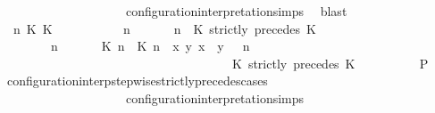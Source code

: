 \begin{isabellebody}
\ \ \ \ \ \ \ \ \ \ \ \ \ \ \ \ \ \ \ \ configuration{\isacharunderscore}interpretation{\isachardot}simps\ \isamarkupfalse%
\ blast\isanewline
\ \ \ \ \isamarkupfalse%
\isanewline
\ \ \ \ \ \ \isamarkupfalse%
\ {\isasymGamma}\ n\ K\ K\ {\isasymPsi}\ {\isasymPhi}\isanewline
\ \ \ \ \ \ \isamarkupfalse%
\ {\isacartoucheopen}{\isacharparenleft}{\isasymGamma}\ n\ {\isasymturnstile}\ {\isasymPsi}\ {\isasymtriangleright}\ {\isasymPhi}\ {\isacharequal}\ {\isacharparenleft}{\isasymGamma}{\isacharcomma}\ n\ {\isasymturnstile}\ {\isacharparenleft}{\isacharparenleft}K\ strictly\ precedes\ K\ {\isacharhash}\ {\isasymPsi}{\isacharparenright}\ {\isasymtriangleright}\ {\isasymPhi}{\isacharparenright}{\isacartoucheclose}\isanewline
\ \ \ \ \ \ \ {\isacartoucheopen}{\isacharparenleft}{\isasymGamma}\ n\ {\isasymturnstile}\ {\isasymPsi}\ {\isasymtriangleright}\ {\isasymPhi}\ {\isacharequal}\ {\isacharparenleft}{\isacharparenleft}{\isacharparenleft}{\isasymlceil}{\isacharhash}\isactrlsup {\isasymle}\ K\ n{\isacharcomma}\ {\isacharhash}\isactrlsup {\isacharless}\ K\ n{\isasymrceil}\ {\isasymin}\ {\isacharparenleft}{\isasymlambda}{\isacharparenleft}x{\isacharcomma}\ y{\isacharparenright}{\isachardot}\ x\ {\isasymle}\ y{\isacharparenright}{\isacharparenright}\ {\isacharhash}\ {\isasymGamma}{\isacharparenright}{\isacharcomma}\ n\isanewline
\ \ \ \ \ \ \ \ \ \ \ \ \ \ \ \ \ \ \ \ \ \ \ \ \ \ \ \ \ \ \ \ \ \ {\isasymturnstile}\ {\isasymPsi}\ {\isasymtriangleright}\ {\isacharparenleft}{\isacharparenleft}K\ strictly\ precedes\ K\ {\isacharhash}\ {\isasymPhi}{\isacharparenright}{\isacharparenright}{\isacartoucheclose}\isanewline
\ \ \ \ \ \ \isamarkupfalse%
\ {\isacharquery}P\ \isamarkupfalse%
\ configuration{\isacharunderscore}interp{\isacharunderscore}stepwise{\isacharunderscore}strictly{\isacharunderscore}precedes{\isacharunderscore}cases\isanewline
\ \ \ \ \ \ \ \ \ \ \ \ \ \ \ \ \ \ \ \ configuration{\isacharunderscore}interpretation{\isachardot}simps\ \isamarkupfalse%

\end{isabellebody}

